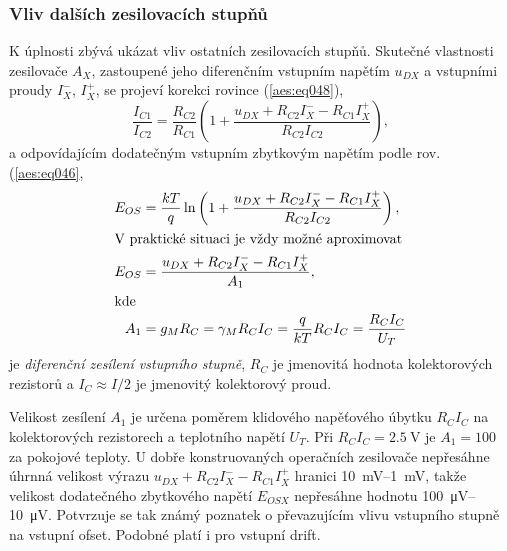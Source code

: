       \subsubsection{Vliv dalších zesilovacích stupňů}\label{aesIchIIIsecIIIssecVIII}
        K úplnosti zbývá ukázat vliv ostatních zesilovacích stupňů. Skutečné vlastnosti zesilovače
        \(A_X\), zastoupené jeho diferenčním vstupním napětím \(u_{DX}\) a vstupními proudy
        \(I_X^-\), \(I_X^+\), se projeví korekci rovince (\ref{aes:eq048}),
        \begin{equation*}
          \dfrac{I_{C1}}{I_{C2}} = \dfrac{R_{C2}}{R_{C1}}
          \left(1 + \dfrac{u_{DX} + R_{C2}I_X^- - R_{C1}I_X^+}{R_{C2}I_{C2}}\right),
        \end{equation*}
        a odpovídajícím dodatečným vstupním zbytkovým napětím podle rov. (\ref{aes:eq046},
        \begin{subequations}\label{aes:eq063}
          \begin{align}
            E_{OS} &= \dfrac{kT}{q}\ln
            \left(1 + 
              \dfrac{u_{DX} + R_{C2}I_X^- - R_{C1}I_X^+}{R_{C2}I_{C2}}
            \right),                                                         \label{aes:eq063a}  \\
            \shortintertext{V praktické situaci je vždy možné aproximovat}
            E_{OS} &= \dfrac{u_{DX} + R_{C2}I_X^- - R_{C1}I_X^+}{A_1},       \label{aes:eq063b}  \\
            \shortintertext{kde}
            A_1   &= g_MR_C = \gamma_MR_CI_C 
                   = \dfrac{q}{kT}R_CI_C = \dfrac{R_CI_C}{U_T}               \label{aes:eq063c}
          \end{align}
        \end{subequations}
        je \emph{diferenční zesílení vstupního stupně}, \(R_C\) je jmenovitá hodnota kolektorových
        rezistorů a \(I_C \approx I/2\) je jmenovitý kolektorový proud.

        Velikost zesílení \(A_1\) je určena poměrem klidového napěťového úbytku \(R_CI_C\) na
        kolektorových rezistorech a teplotního napětí \(U_T\). Při \(R_CI_C = \SI{2.5}{\V}\) je
        \(A_1 = 100\) za pokojové teploty. U dobře konstruovaných operačních zesilovače nepřesáhne
        úhrnná velikost výrazu \(u_{DX} + R_{C2}I_X^- - R_{C1}I_X^+\) hranici \SIrange{10}{1}{\mV},
        takže velikost dodatečného zbytkového napětí \(E_{OSX}\) nepřesáhne hodnotu
        \SIrange{100}{10}{\uV}. Potvrzuje se tak známý poznatek o převazujícím vlivu vstupního
        stupně na vstupní ofset. Podobné platí i pro vstupní drift.

